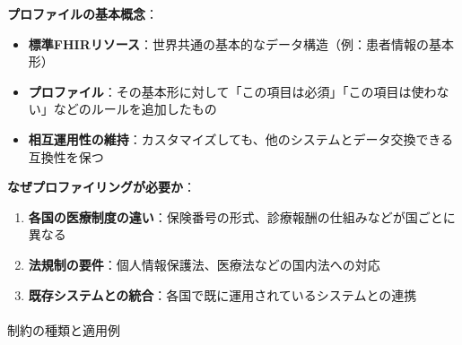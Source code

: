 \documentclass[
  a4paper,
  a4paper,
  11pt]{ltjsbook}
\makeatletter
\let\oldparagraph\paragraph
\renewcommand{\paragraph}{
    \@ifstar
      \xxxParagraphStar
      \xxxParagraphNoStar
  }
\newcommand{\xxxParagraphStar}[1]{\oldparagraph*{#1}\mbox{}}
\newcommand{\xxxParagraphNoStar}[1]{\oldparagraph{#1}\mbox{}}
\providecommand{\tightlist}{%
  \setlength{\itemsep}{0pt}\setlength{\parskip}{0pt}}
\makeatother
\begin{document}
\textbf{プロファイルの基本概念}：

\begin{itemize}
\tightlist
\item
  \textbf{標準FHIRリソース}：世界共通の基本的なデータ構造（例：患者情報の基本形）
\item
  \textbf{プロファイル}：その基本形に対して「この項目は必須」「この項目は使わない」などのルールを追加したもの
\item
  \textbf{相互運用性の維持}：カスタマイズしても、他のシステムとデータ交換できる互換性を保つ
\end{itemize}

\textbf{なぜプロファイリングが必要か}：

\begin{enumerate}
\def\labelenumi{\arabic{enumi}.}
\tightlist
\item
  \textbf{各国の医療制度の違い}：保険番号の形式、診療報酬の仕組みなどが国ごとに異なる
\item
  \textbf{法規制の要件}：個人情報保護法、医療法などの国内法への対応
\item
  \textbf{既存システムとの統合}：各国で既に運用されているシステムとの連携
\end{enumerate}

\paragraph{制約の種類と適用例}\label{ux5236ux7d04ux306eux7a2eux985eux3068ux9069ux7528ux4f8b}
\end{document}
